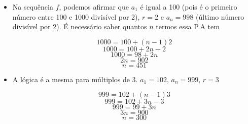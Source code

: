 \documentclass[11pt]{article}
\begin{document}
\begin{itemize}
  \item Na sequência $f$, podemos afirmar que $a_{1}$ é igual a 100 (pois é o primeiro número entre 100 e 1000 divisível por 2), $r = 2$ e $a_{n} = 998$ (último número divisível por 2). É necessário saber quantos $n$ termos essa P.A tem

        \[1000 = 100 + (n - 1)2\]
        \[1000 = 100 + 2n - 2\]
        \[1000 = 98 + 2n\]
        \[2n = 902\]
        \[n = 451\]

  \item A lógica é a mesma para múltiplos de 3. $a_{1} = 102$, $a_{n} = 999$, $r = 3$

        \[999 = 102 + (n - 1)3\]
        \[999 = 102 + 3n - 3\]
        \[999 = 99 + 3n\]
        \[3n = 900\]
        \[n = 300\]
\end{itemize}
\end{document}
